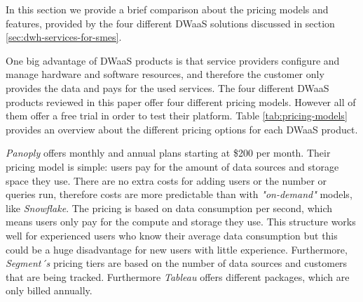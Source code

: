 \documentclass[../paper.tex]{subfiles}
\begin{document}
In this section we provide a brief comparison about the pricing models and features,
provided by the four different DWaaS solutions discussed in section
\ref{sec:dwh-services-for-smes}.

One big advantage of DWaaS products is that service providers configure and manage
hardware and software resources, and therefore the customer only provides the data
and pays for the used services. The four different DWaaS products reviewed in this
paper offer four different pricing models. However all of them offer a free trial in
order to test their platform. Table \ref{tab:pricing-models} provides an overview
about the different pricing options for each DWaaS product.

\textit{Panoply} offers monthly and annual plans starting at \$200 per month. Their
pricing model is simple: users pay for the amount of data sources and storage space
they use. There are no extra costs for adding users or the number or queries run,
therefore costs are more predictable than with \textit{"on-demand"} models, like
\textit{Snowflake}. The pricing is based on data consumption per second, which means
users only pay for the compute and storage they use. This structure works well for
experienced users who know their average data consumption but this could be a huge
disadvantage for new users with little experience. Furthermore, \textit{Segment´s}
pricing tiers are based on the number of data sources and customers that are being
tracked. Furthermore \textit{Tableau} offers different packages, which are only billed
annually.
\end{document}
